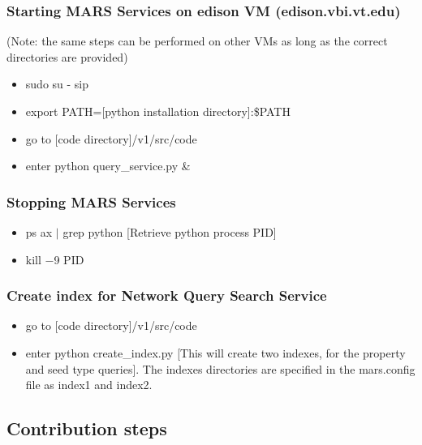 \subsubsection{Starting MARS Services on edison VM (edison.vbi.vt.edu)}
(Note: the same steps can be performed on other VMs as long as the correct directories are provided)
\begin{itemize}
\item sudo su - sip
\item export PATH=[python installation directory]:\$PATH
\item go to [code directory]/v1/src/code
\item enter python query\_service.py \&
\end{itemize}


\subsubsection{Stopping MARS Services}
\begin{itemize}
\item ps ax $|$ grep python [Retrieve python process PID]
\item kill $-$9 PID

\end{itemize}

\subsubsection{Create index for Network Query Search Service}

\begin{itemize}
\item go to [code directory]/v1/src/code
\item enter python create\_index.py [This will create two indexes, for the property and seed type queries]. The indexes directories are specified in the mars.config file as index1 and index2.
\end{itemize}




\subsection{Contribution steps}

